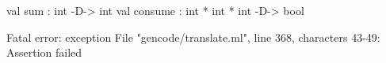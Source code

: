 \chklistingfalse
{}
\begin{ChkListingMsg}
val sum : int -D-> int 
val consume : int * int * int -D-> bool 
\end{ChkListingMsg}
\begin{ChkListingErr}
Fatal error: exception File "gencode/translate.ml", line 368, characters 43-49: Assertion failed
\end{ChkListingErr}
